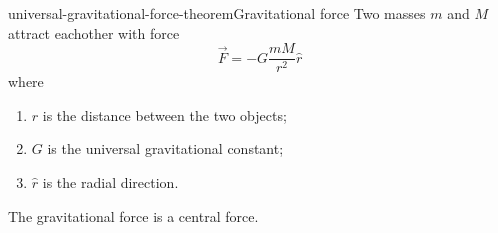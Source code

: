 \documentclass[preview]{standalone}
\begin{document}
\begin{snippettheorem}{universal-gravitational-force-theorem}{Gravitational force}
    Two masses \(m\) and \(M\) attract eachother with force
    \[
        \vec{F} = -G \frac{mM}{r^2} \hat{r}
    \]
    where
    \begin{enumerate}
        \item \(r\) is the distance between the two objects;
        \item \(G\) is the universal gravitational constant;
        \item \(\hat{r}\) is the radial direction.
    \end{enumerate}
\end{snippettheorem}

\begin{plainhtml}
    The gravitational force is a central force.
\end{plainhtml}
\end{document}
